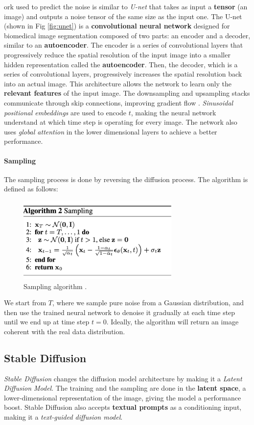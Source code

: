 \documentclass[preprint]{elsarticle}
\begin{document}
ork used to predict the noise is similar to \emph{U-net} \cite{ronneberger2015unet} that takes as input a 
\textbf{tensor} (an image) and outputs a noise tensor
of the same size as the input one.
The U-net (shown in Fig \ref{fig:unet}) is a \textbf{convolutional neural network} designed for biomedical image segmentation
composed of two parts: an encoder and a decoder, similar to an \textbf{autoencoder}.
The encoder is a series of convolutional layers that progressively reduce the spatial resolution of the input image 
into a smaller hidden representation called the \textbf{autoencoder}.
Then, the decoder, which is a series of convolutional layers, progressively increases the spatial resolution back into an actual image.
This architecture allows the network to learn only the \textbf{relevant features} of the input image.
The downsampling and upsampling stacks communicate through skip connections, improving gradient flow \cite{he2015deep}.
\emph{Sinusoidal positional embeddings} are used to encode $t$, 
making the neural network understand at which time step is operating for every image.
The network also uses \emph{global attention} in the lower dimensional layers to achieve a better performance.

\paragraph{Sampling}
The sampling process is done by reversing the diffusion process. The algorithm is defined as follows:
\begin{figure}[H]
	\centering
	\includegraphics[width=8cm, keepaspectratio]{img/background_img/DDPM-sampling.png}
	\caption{Sampling algorithm \cite{weng2021diffusion}.}
\end{figure}
We start from $T$, where we sample pure noise from a Gaussian distribution, 
and then use the trained neural network to denoise it gradually at each time step until we end up at time step $t=0$.
Ideally, the algorithm will return an image coherent with the real data distribution.


\subsection{Stable Diffusion}\label{sec:stable-diffusion}
\emph{Stable Diffusion} \cite{rombach2022highresolution} changes the diffusion model architecture by making 
it a \emph{Latent Diffusion Model}. 
The training and the sampling are done in the \textbf{latent space}, 
a lower-dimensional representation of the image, giving the model a performance boost.
Stable Diffusion also accepts \textbf{textual prompts} as a conditioning input, making it a \emph{text-guided diffusion model}.
\end{document}
